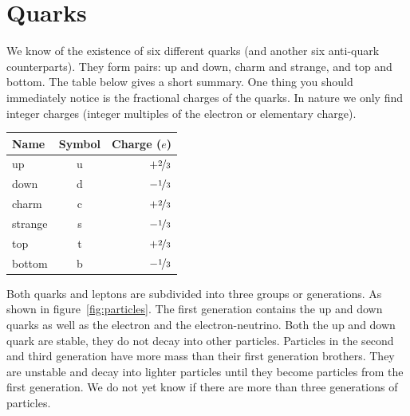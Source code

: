 \documentclass[12pt,a4paper]{article}
\numberwithin{equation}{section}
\numberwithin{figure}{section}
\numberwithin{table}{section}
\begin{document}
\section{Quarks}
We know of the existence of six different quarks (and another six anti-quark counterparts). They form pairs: up and down, charm and strange, and top and bottom. The table below gives a short summary. One thing you should immediately notice is the fractional charges of the quarks. In nature we only find integer charges (integer multiples of the electron or elementary charge).

\begin{center}\begin{tabular}[h] {l c r}
Name & Symbol & Charge ($e$) \\ \hline
up & u & $+\nicefrac{2}{3}$ \\
down & d & $-\nicefrac{1}{3}$ \\
charm & c & $+\nicefrac{2}{3}$ \\
strange & s & $-\nicefrac{1}{3}$ \\
top & t & $+\nicefrac{2}{3}$ \\
bottom & b & $-\nicefrac{1}{3}$ \\
\end{tabular}\end{center}
\label{tab:data_3}

\vspace{0.5cm}

Both quarks and leptons are subdivided into three groups or generations. As shown in figure~\ref{fig:particles}. The first generation contains the up and down quarks as well as the electron and the electron-neutrino. Both the up and down quark are stable, they do not decay into other particles. Particles in the second and third generation have more mass than their first generation brothers. They are unstable and decay into lighter particles until they become particles from the first generation. We do not yet know if there are more than three generations of particles.
\end{document}
